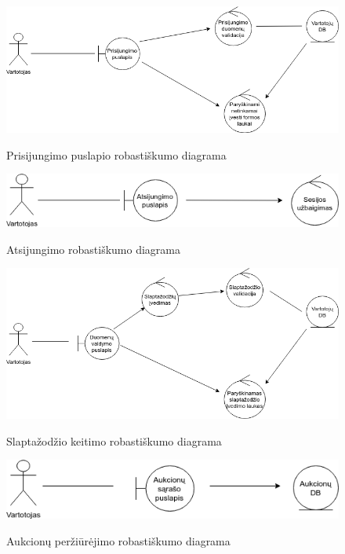 \documentclass{VUMIFPSkursinis}
\begin{document}
		\begin{figure}[H]
		\centering
		\includegraphics[width=\linewidth]{img/prisijungimas.png}
		\label{fig:prisijungimas}
		\caption{Prisijungimo puslapio robastiškumo diagrama}
	\end{figure}

		\begin{figure}[H]
		\centering
		\includegraphics[width=\linewidth]{img/atsijungimas.png}
		\label{fig:atsijungti}
		\caption{Atsijungimo robastiškumo diagrama}
	\end{figure}

		\begin{figure}[H]
		\centering
		\includegraphics[width=\linewidth]{img/slaptazodis.png}
		\label{fig:slaptazodis}
		\caption{Slaptažodžio keitimo robastiškumo diagrama}
	\end{figure}

		\begin{figure}[H]
		\centering
		\includegraphics[width=\linewidth]{img/aukcionai.png}
		\label{fig:aukcionai}
		\caption{Aukcionų peržiūrėjimo robastiškumo diagrama}
	\end{figure}
\end{document}
